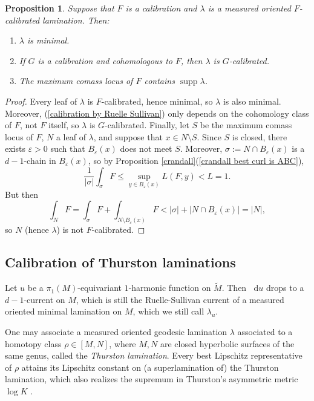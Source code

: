 \documentclass[reqno,11pt]{amsart}
\newcommand*\dif{\mathop{}\!\mathrm{d}}
\DeclareMathOperator{\supp}{supp}
\newcommand{\dfn}[1]{\emph{#1}\index{#1}}
\newtheorem{proposition}[theorem]{Proposition}
\theoremstyle{definition}
\numberwithin{equation}{section}
\begin{document}
\begin{proposition}\label{properties of calibrated laminations}
Suppose that $F$ is a calibration and $\lambda$ is a measured oriented $F$-calibrated lamination.
Then:
\begin{enumerate}
\item $\lambda$ is minimal.
\item If $G$ is a calibration and cohomologous to $F$, then $\lambda$ is $G$-calibrated.
\item The maximum comass locus of $F$ contains $\supp \lambda$.
\end{enumerate}
\end{proposition}
\begin{proof}
Every leaf of $\lambda$ is $F$-calibrated, hence minimal, so $\lambda$ is also minimal.
Moreover, (\ref{calibration by Ruelle Sullivan}) only depends on the cohomology class of $F$, not $F$ itself, so $\lambda$ is $G$-calibrated.
Finally, let $S$ be the maximum comass locus of $F$, $N$ a leaf of $\lambda$, and suppose that $x \in N \setminus S$.
Since $S$ is closed, there exists $\varepsilon > 0$ such that $B_\varepsilon(x)$ does not meet $S$.
Moreover, $\sigma := N \cap B_\varepsilon(x)$ is a $d-1$-chain in $B_\varepsilon(x)$, so by Proposition \ref{crandall}(\ref{crandall best curl is ABC}),
$$\frac{1}{|\sigma|} \int_\sigma F \leq \sup_{y \in B_\varepsilon(x)} L(F, y) < L = 1.$$
But then 
$$\int_N F = \int_\sigma F + \int_{N \setminus B_\varepsilon(x)} F < |\sigma| + |N \cap B_\varepsilon(x)| = |N|,$$
so $N$ (hence $\lambda$) is not $F$-calibrated.
\end{proof}


\subsection{Calibration of Thurston laminations}
Let $u$ be a $\pi_1(M)$-equivariant $1$-harmonic function on $\tilde M$.
Then $\dif u$ drops to a $d-1$-current on $M$, which is still the Ruelle-Sullivan current of a measured oriented minimal lamination on $M$, which we still call $\lambda_u$.

One may associate a measured oriented geodesic lamination $\lambda$ associated to a homotopy class $\rho \in [M, N]$, where $M, N$ are closed hyperbolic surfaces of the same genus, called the \dfn{Thurston lamination}.
Every best Lipschitz representative of $\rho$ attains its Lipschitz constant on (a superlamination of) the Thurston lamination, which also realizes the supremum in Thurston's asymmetric metric $\log K$ \cite{Thurston98}.
\end{document}
